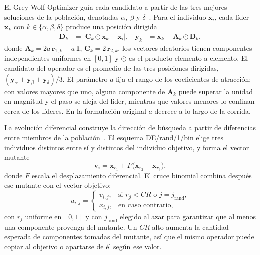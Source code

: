 \documentclass[runningheads]{llncs}
\begin{document}
El Grey Wolf Optimizer guía cada candidato a partir de las tres mejores soluciones de la población, denotadas $\alpha$, $\beta$ y $\delta$~\cite{mirjalili2014grey}. Para el individuo $\mathbf{x}_i$, cada líder $\mathbf{x}_k$ con $k \in \{\alpha, \beta, \delta\}$ produce una posición dirigida
\begin{align}
\mathbf{D}_k &= \bigl|\mathbf{C}_k \odot \mathbf{x}_k - \mathbf{x}_i\bigr|, &
\mathbf{y}_k &= \mathbf{x}_k - \mathbf{A}_k \odot \mathbf{D}_k, \label{eq:gwo}
\end{align}
donde $\mathbf{A}_k = 2a\,\mathbf{r}_{1,k} - a\,\mathbf{1}$, $\mathbf{C}_k = 2\,\mathbf{r}_{2,k}$, los vectores aleatorios tienen componentes independientes uniformes en $[0,1]$ y $\odot$ es el producto elemento a elemento. El candidato del operador es el promedio de las tres posiciones dirigidas, $(\mathbf{y}_\alpha + \mathbf{y}_\beta + \mathbf{y}_\delta)/3$. El parámetro $a$ fija el rango de los coeficientes de atracción: con valores mayores que uno, alguna componente de $\mathbf{A}_k$ puede superar la unidad en magnitud y el paso se aleja del líder, mientras que valores menores lo confinan cerca de los líderes. En la formulación original $a$ decrece a lo largo de la corrida.

La evolución diferencial construye la dirección de búsqueda a partir de diferencias entre miembros de la población~\cite{storn1997differential}. El esquema DE/rand/1/bin elige tres individuos distintos entre sí y distintos del individuo objetivo, y forma el vector mutante
\begin{equation}
\mathbf{v}_i = \mathbf{x}_{r_1} + F\bigl(\mathbf{x}_{r_2} - \mathbf{x}_{r_3}\bigr),
\label{eq:de_mutacion}
\end{equation}
donde $F$ escala el desplazamiento diferencial. El cruce binomial combina después ese mutante con el vector objetivo:
\begin{equation}
u_{i,j} =
\begin{cases}
v_{i,j}, & \text{si } r_j < CR \text{ o } j = j_{\mathrm{rand}}, \\
x_{i,j}, & \text{en caso contrario},
\end{cases}
\label{eq:de_cruce}
\end{equation}
con $r_j$ uniforme en $[0,1]$ y con $j_{\mathrm{rand}}$ elegido al azar para garantizar que al menos una componente provenga del mutante. Un $CR$ alto aumenta la cantidad esperada de componentes tomadas del mutante, así que el mismo operador puede copiar al objetivo o apartarse de él según ese valor.
\end{document}
